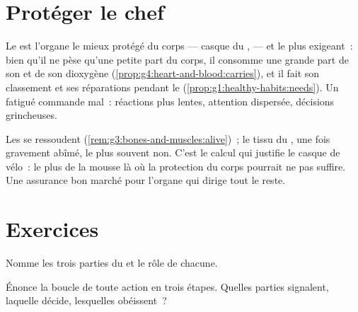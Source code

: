 \section{Protéger le chef}

\begin{proposition}\label{prop:g5:brain-in-command:protect}
Le  est l'organe le mieux protégé du corps --- casque du
,  --- et le plus exigeant~: bien qu'il ne
pèse qu'une petite part du corps, il consomme une grande part de son
 et de son dioxygène
(\cref{prop:g4:heart-and-blood:carries}), et il fait son classement
et ses réparations pendant le \emph{}
(\cref{prop:g1:healthy-habits:needs}). Un  fatigué commande
mal~: réactions plus lentes, attention dispersée, décisions
grincheuses.
\end{proposition}
\admitted

\begin{example}\label{ex:g5:brain-in-command:helmet}
Les  se ressoudent (\cref{rem:g3:bones-and-muscles:alive})~; le
tissu du , une fois gravement abîmé, le plus souvent non.
C'est le calcul qui justifie le casque de vélo~: le  plus de la
mousse là où la protection du corps pourrait ne pas suffire. Une
assurance bon marché pour l'organe qui dirige tout le reste.
\end{example}

\section{Exercices}

\begin{exercise}[$\star$]\label{exo:g5:brain-in-command:1}
Nomme les trois parties du  et le rôle de chacune.
\end{exercise}

\begin{exercise}[$\star$]\label{exo:g5:brain-in-command:2}
Énonce la boucle de toute action en trois étapes. Quelles parties
signalent, laquelle décide, lesquelles obéissent~?
\end{exercise}

